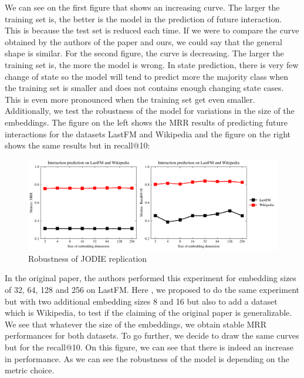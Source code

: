 
We can see on the first figure that shows an increasing curve. The larger the training set is, the better is the model in the prediction of future interaction. This is because the test set is reduced each time. If we were to compare the curve obtained by the authors of the paper and ours, we could say that the general shape is similar.
For the second figure, the curve is decreasing. The larger the training set is, the more the model is wrong. In state prediction, there is very few change of state so the model will tend to predict more the majority class when the training set is smaller and does not contains enough changing state cases. This is even more pronounced when the training set get even smaller.\\

Additionally, we test the robustness of the model for variations in the size of the embeddings. The figure on the left shows the MRR results of predicting future interactions for the datasets LastFM and Wikipedia and the figure on the right shows the same results but in recall@10:
\begin{figure}[H]
    \centering
    \includegraphics[width = \textwidth]{image/lastFM-wiki.pdf}
    \caption{Robustness of JODIE replication}
\end{figure}
In the original paper, the authors performed this experiment for embedding sizes of 32, 64, 128 and 256 on LastFM. Here , we proposed to do the same experiment but with two additional embedding sizes 8 and 16 but also to add a dataset which is Wikipedia, to test if the claiming of the original paper is generalizable. We see that whatever the size of the embeddings, we obtain stable MRR performances for both datasets. To go further, we decide to draw the same curves but for the recall@10. On this figure, we can see that there is indeed an increase in performance. As we can see the robustness of the model is depending on the metric choice.\\


